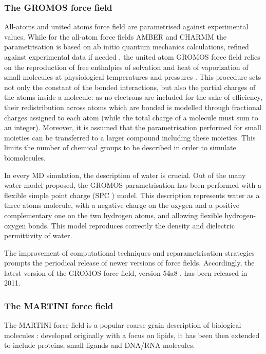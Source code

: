 \documentclass[graybox]{svmult}
\begin{document}
\subsubsection{The GROMOS force field}
All-atoms and united atoms force field are parametrised against experimental values.
%
While for the all-atom force fields AMBER and CHARMM the parametrisation is based on ab initio quantum mechanics calculations, refined against experimental data if needed \cite{Maier2015,Dickson2014,Wang2004_amber,MacKerell1998,Klauda2010}, the united atom GROMOS force field relies on the reproduction of free enthalpies of solvation and heat of vaporization of small molecules at physiological temperatures and pressures \cite{Oostenbrink2005,Schmid2011,Reif2013}.
%
This procedure sets not only the constant of the bonded interactions, but also the partial charges of the atoms inside a molecule: as no electrons are included for the sake of efficiency, their redistribution across atoms which are bonded is modelled through fractional charges assigned to each atom (while the total charge of a molecule must sum to an integer).
%
Moreover, it is assumed that the parametrisation performed for small moieties can be transferred to a larger compound including these moieties. This limits the number of chemical groups to be described in order to simulate biomolecules.

In every MD simulation, the description of water is crucial. Out of the many water model proposed, the GROMOS parametrisation has been performed with a flexible simple point charge (SPC \cite{Berendsen1981}) model. This description represents water as a three atoms molecule, with a negative charge on the oxygen and a positive complementary one on the two hydrogen atoms, and allowing flexible hydrogen-oxygen bonds. This model reproduces correctly the density and dielectric permittivity of water.

The improvement of computational techniques and reparametrisation strategies prompts the periodical release of newer versions of force fields. Accordingly, the latest version of the GROMOS force field, version 54a8 \cite{Schmid2011}, has been released in 2011.

\subsubsection{The MARTINI force field}

The MARTINI force field is a popular coarse grain description of biological molecules \cite{Marrink2007,Monticelli2008,DeJong2013}: developed originally with a focus on lipids, it has been then extended to include proteins, small ligands and DNA/RNA molecules.
\end{document}
